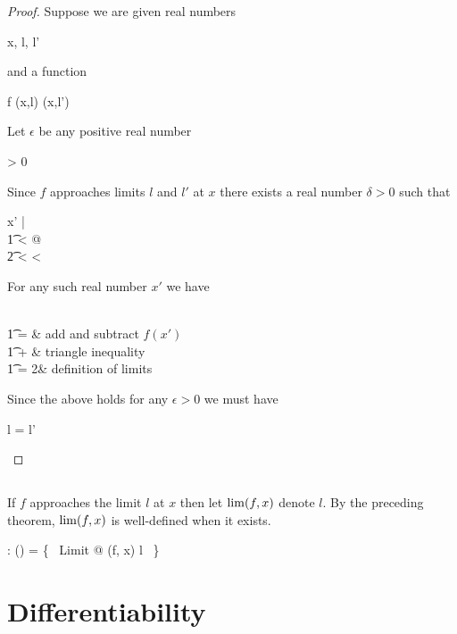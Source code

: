 \documentclass{amsart}
\begin{document}
\begin{proof}
Suppose we are given real numbers
\begin{argue}
	x, l, l' \in \R 
\end{argue}
and a function
\begin{argue}
	f \in \limRR(x,l) \cap \limRR(x,l')
\end{argue}
Let $\epsilon$ be any positive real number
\begin{argue}
	\epsilon > 0
\end{argue}
Since $f$ approaches limits $l$ and $l'$ at $x$ there exists a real number $\delta > 0$ such that
\begin{argue}
	\forall x' \in \R |  \\
	\t1	\zeroR \ltR {}< \delta @ \\
	\t2		  < \epsilon \land {} < \epsilon
\end{argue}
For any such real number $x'$ we have
\begin{argue}
	 \\
	\t1	=  			& add and subtract $f(x')$ \\
	\t1	\leq {} +  	& triangle inequality \\
	\t1	= 2\epsilon					& definition of limits
\end{argue}
Since the above holds for any $\epsilon > 0$ we must have
\begin{argue}
	l = l'
\end{argue}

\end{proof}

\subsection{}

If $f$ approaches the limit $l$ at $x$ then let $\operatorname{lim}(f,x)$ denote $l$.
By the preceding theorem, $\operatorname{lim}(f,x)$ is well-defined when it exists.

\begin{axdef}
	\limFR: (\R \pfun \R) \cross \R \pfun \R
\where
	\limFR = \{~ Limit @ (f, x) \mapsto l ~\}
\end{axdef}

\section{Differentiability}
\end{document}
